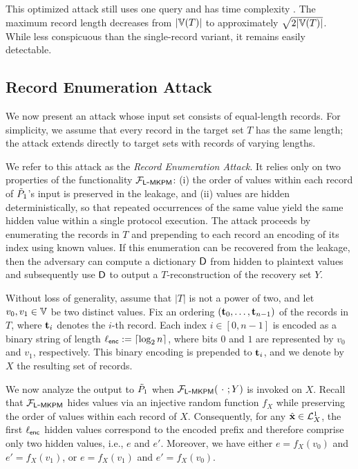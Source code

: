 This optimized attack still uses one query and has time complexity . The maximum record length decreases from $|\Ispace[T]|$ to approximately $\sqrt{2|\Ispace[T]|}$. While less conspicuous than the single-record variant, it remains easily detectable. %




\subsection{Record Enumeration Attack}\label{sec:rec_enum_attack}
We now present an attack whose input set consists of equal-length records. For
simplicity, we assume that every record in the target set $T$ has the same
length; the attack extends directly to target sets with records of varying
lengths.

We refer to this attack as the \emph{Record Enumeration Attack}. It relies only
on two properties of the functionality $\mathcal{F}_{\mathsf{L\mbox{-}MKPM}}$: (i) the order of values
within each record of $\tilde{P}_1$'s input is preserved in the leakage, and (ii) values are hidden deterministically, so that
repeated occurrences of the same value yield the same hidden value within a single protocol execution. The attack proceeds by enumerating the records in $T$ and prepending to each record an encoding of its index using known values. If this enumeration can be recovered from the leakage, then the adversary can compute a dictionary $\mathsf{D}$ from hidden to plaintext values and subsequently use $\mathsf{D}$ to output a $T$-reconstruction of the recovery set $Y$.

Without loss of generality, assume that $|T|$ is not a power of two, and let
$v_0, v_1 \in \Ispace[]$ be two distinct values. Fix an ordering
$(\mathbf{t}_0,\ldots,\mathbf{t}_{n-1})$ of the records in $T$, where $\mathbf{t}_i$ denotes the
$i$-th record. Each index $i \in [0,n-1]$ is encoded as a binary string of
length $\ell_{\mathsf{enc}} := \lceil \log_2 n\rceil$, where bits $0$ and $1$ are represented
by $v_0$ and $v_1$, respectively. This binary encoding is prepended to $\mathbf{t}_i$,
and we denote by $X$ the resulting set of records. 

We now analyze the output to $\tilde{P}_1$ when $\mathcal{F}_{\mathsf{L\mbox{-}MKPM}}(\ \cdot\ ; Y)$ is
invoked on $X$. Recall that $\mathcal{F}_{\mathsf{L\mbox{-}MKPM}}$ hides
values via an injective random function $f_X$ while preserving the order of
values within each record of $X$. Consequently, for any $\hat{\mathbf{x}} \in \mathcal{L}^{1}_X$, the
first $\ell_{\mathsf{enc}}$ hidden values correspond to the encoded prefix and therefore
comprise only two hidden values, i.e., $e$ and $e'$. Moreover, we have
either $e = f_X(v_0)$ and $e' = f_X(v_1)$, or $e = f_X(v_1)$ and
$e' = f_X(v_0)$.

